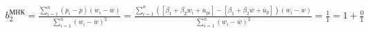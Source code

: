 \documentclass[a4paper,12pt]{article}
\begin{document}
\begin{multline}
  b_2^\text{МНК} =
  \frac{\sum\limits_{i=1}^{n}(p_i-\overline{p})(w_i-\overline{w})}{\sum\limits_{i=1}^{n}(w_i-\overline{w})^2} =
  \frac{\sum\limits_{i=1}^{n}([\beta_1+\beta_2w_i+u_\mathrm{pi}]-[\beta_1+\beta_2\overline{w}+\overline{u}_p])(w_i-\overline{w})}{\sum\limits_{i=1}^{n}(w_i-\overline{w})^2} =
  \frac{1}{1} =
  1 + \frac{0}{1} \\
\end{multline}
\end{document}
